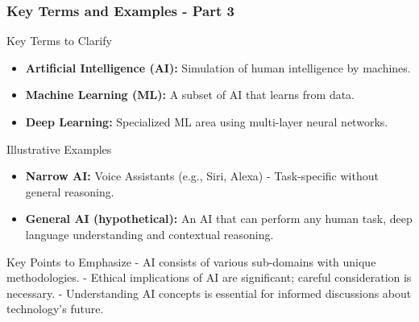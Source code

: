\documentclass[aspectratio=169]{beamer}
\begin{document}
\begin{frame}[fragile]
    \frametitle{Key Terms and Examples - Part 3}
    \begin{block}{Key Terms to Clarify}
        \begin{itemize}
            \item \textbf{Artificial Intelligence (AI):} Simulation of human intelligence by machines.
            \item \textbf{Machine Learning (ML):} A subset of AI that learns from data.
            \item \textbf{Deep Learning:} Specialized ML area using multi-layer neural networks.
        \end{itemize}
    \end{block}
    
    \begin{block}{Illustrative Examples}
        \begin{itemize}
            \item \textbf{Narrow AI:} Voice Assistants (e.g., Siri, Alexa) - Task-specific without general reasoning.
            \item \textbf{General AI (hypothetical):} An AI that can perform any human task, deep language understanding and contextual reasoning.
        \end{itemize}
    \end{block}
    
    \begin{block}{Key Points to Emphasize}
        - AI consists of various sub-domains with unique methodologies.
        - Ethical implications of AI are significant; careful consideration is necessary.
        - Understanding AI concepts is essential for informed discussions about technology's future.
    \end{block}
\end{frame}
\end{document}
